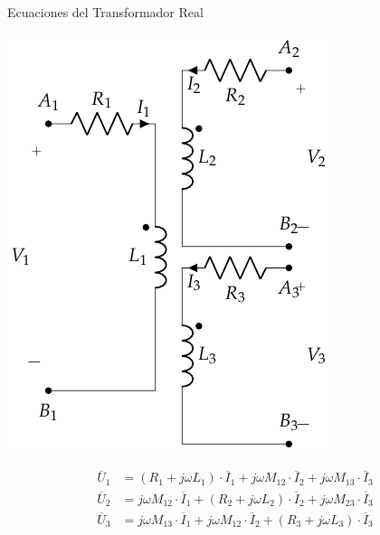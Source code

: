\documentclass[xcolor={usenames,svgnames,dvipsnames}]{beamer}
\begin{document}
\begin{frame}[label={sec:org36d9744}]{Ecuaciones del Transformador Real}
\begin{center}
\includegraphics[height=0.6\textheight]{../figs/TrafoVariosDevanados.pdf}
\end{center}

\begin{align*}
  \overline{U}_1 &= (R_1 + j \omega L_1) \cdot \overline{I}_1 + j \omega M_{12} \cdot\overline{I}_2 + j \omega M_{13} \cdot\overline{I}_3\\
  \overline{U}_2 &= j \omega M_{12} \cdot \overline{I}_1 + (R_2 + j \omega L_2) \cdot \overline{I}_2 + j \omega M_{23} \cdot \overline{I}_3\\
  \overline{U}_3 &= j \omega M_{13} \cdot \overline{I}_1 + j \omega M_{12} \cdot\overline{I}_2 + (R_3 + j \omega L_3) \cdot \overline{I}_3
\end{align*}
\end{frame}
\end{document}
